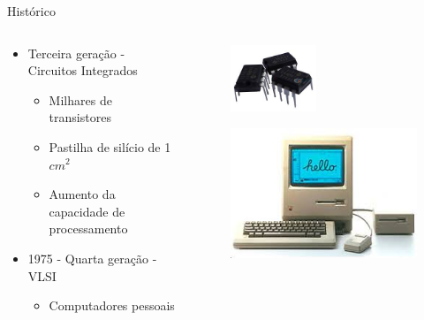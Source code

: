 \documentclass[aspectratio=169,
				xcolor=table]{beamer}
\begin{document}
	\begin{frame}{Histórico}
		\begin{columns}
			\begin{column}{0.6\textwidth}
				\begin{itemize}
					\item Terceira geração - Circuitos Integrados
					\begin{itemize}
						\item Milhares de transistores
						\item Pastilha de silício de 1 $cm^2$
						\item Aumento da capacidade de processamento
					\end{itemize}					
					\vspace{1em}
					\item 1975 - Quarta geração - VLSI
					\begin{itemize}
						\item Computadores pessoais
					\end{itemize}
				\end{itemize}
				
			\end{column}
			\begin{column}{0.4\textwidth}
				\begin{figure}[hbtp]
				\centering
				\includegraphics[height=2cm, keepaspectratio]{../figs/cap04/transistor.png}
				\end{figure}	
				
				\begin{figure}[hbtp]
				\centering
				\includegraphics[width=.75\textwidth, keepaspectratio]{../figs/cap04/lisa.png}
				\end{figure}	
			\end{column}
		\end{columns}
	\end{frame}
	
\end{document}
